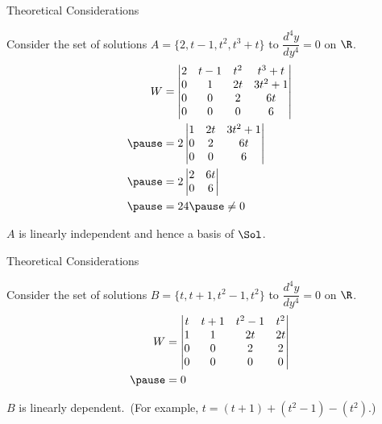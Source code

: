 \documentclass{beamer}
\begin{document}
\begin{frame}{Theoretical Considerations}
\begin{example}
Consider the set of solutions $A=\{2,t-1,t^2,t^3+t\}$ to $\dfrac{d^4y}{dy^4}=0$ on $\R$.\pause
\begin{equation*}
\begin{aligned}
W &=
\begin{vmatrix}
2 & t-1 & t^2 & t^3+t  \\
0 & 1   & 2t  & 3t^2+1 \\
0 & 0   & 2   & 6t     \\
0 & 0   & 0   & 6      \\
\end{vmatrix}\\\pause
&=2
\begin{vmatrix}
1   & 2t  & 3t^2+1 \\
0   & 2   & 6t     \\
0   & 0   & 6      \\
\end{vmatrix}\\\pause
&=2
\begin{vmatrix}
2   & 6t     \\
0   & 6      \\
\end{vmatrix}\\\pause
&=24\pause
\neq0
\end{aligned}
\end{equation*}

\vspace{-3mm}
$A$ is linearly independent and hence a basis of $\Sol$.
\end{example}
\end{frame}

\begin{frame}{Theoretical Considerations}
\begin{example}
Consider the set of solutions $B=\{t,t+1,t^2-1,t^2\}$ to $\dfrac{d^4y}{dy^4}=0$ on $\R$.\pause
\begin{equation*}
\begin{aligned}
W &=
\begin{vmatrix}
t & t+1 & t^2 -1 & t^2  \\
1 & 1   & 2t     & 2t   \\
0 & 0   & 2      & 2    \\
0 & 0   & 0      & 0    \\
\end{vmatrix}\\\pause
&=0
\end{aligned}
\end{equation*}

\vspace{-3mm}
$B$ is linearly dependent.\pause\ (For example, $t=(t+1)+(t^2-1)-(t^2)$.)
\end{example}
\end{frame}
\end{document}
